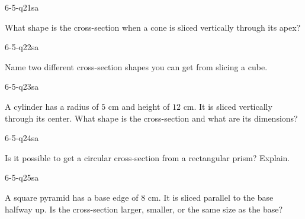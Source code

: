 \begin{practiceQuestion}{6-5-q21}{sa}
\begin{questionText}
What shape is the cross-section when a cone is sliced vertically through its apex?
\end{questionText}
\end{practiceQuestion}

\begin{practiceQuestion}{6-5-q22}{sa}
\begin{questionText}
Name two different cross-section shapes you can get from slicing a cube.
\end{questionText}
\end{practiceQuestion}

\begin{practiceQuestion}{6-5-q23}{sa}
\begin{questionText}
A cylinder has a radius of $5$ cm and height of $12$ cm. It is sliced vertically through its center. What shape is the cross-section and what are its dimensions?
\end{questionText}
\end{practiceQuestion}

\begin{practiceQuestion}{6-5-q24}{sa}
\begin{questionText}
Is it possible to get a circular cross-section from a rectangular prism? Explain.
\end{questionText}
\end{practiceQuestion}

\begin{practiceQuestion}{6-5-q25}{sa}
\begin{questionText}
A square pyramid has a base edge of $8$ cm. It is sliced parallel to the base halfway up. Is the cross-section larger, smaller, or the same size as the base?
\end{questionText}
\end{practiceQuestion}

